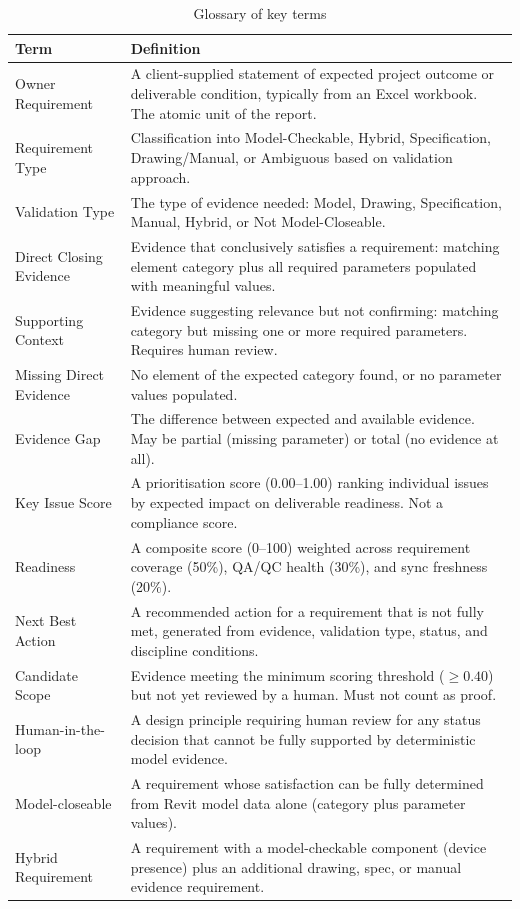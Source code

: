 \documentclass[10pt,letterpaper]{article}
\begin{document}
\begin{longtable}{p{1.6in}p{5.0in}}
\caption{Glossary of key terms}
\label{tab:glossary}\\
\toprule
\textbf{Term} & \textbf{Definition} \\
\midrule
\endhead
Owner Requirement & A client-supplied statement of expected project outcome or deliverable condition,
  typically from an Excel workbook. The atomic unit of the report. \\
Requirement Type & Classification into Model-Checkable, Hybrid, Specification, Drawing/Manual, or
  Ambiguous based on validation approach. \\
Validation Type & The type of evidence needed: Model, Drawing, Specification, Manual, Hybrid, or Not
  Model-Closeable. \\
Direct Closing Evidence & Evidence that conclusively satisfies a requirement: matching element
  category plus all required parameters populated with meaningful values. \\
Supporting Context & Evidence suggesting relevance but not confirming: matching category but missing
  one or more required parameters. Requires human review. \\
Missing Direct Evidence & No element of the expected category found, or no parameter values
  populated. \\
Evidence Gap & The difference between expected and available evidence. May be partial (missing
  parameter) or total (no evidence at all). \\
Key Issue Score & A prioritisation score (0.00--1.00) ranking individual issues by expected impact
  on deliverable readiness. Not a compliance score. \\
Readiness & A composite score (0--100) weighted across requirement coverage (50\%), QA/QC health
  (30\%), and sync freshness (20\%). \\
Next Best Action & A recommended action for a requirement that is not fully met, generated from
  evidence, validation type, status, and discipline conditions. \\
Candidate Scope & Evidence meeting the minimum scoring threshold ($\ge 0.40$) but not yet reviewed by
  a human. Must not count as proof. \\
Human-in-the-loop & A design principle requiring human review for any status decision that cannot be
  fully supported by deterministic model evidence. \\
Model-closeable & A requirement whose satisfaction can be fully determined from Revit model data
  alone (category plus parameter values). \\
Hybrid Requirement & A requirement with a model-checkable component (device presence) plus an
  additional drawing, spec, or manual evidence requirement. \\
\bottomrule
\end{longtable}
\end{document}
